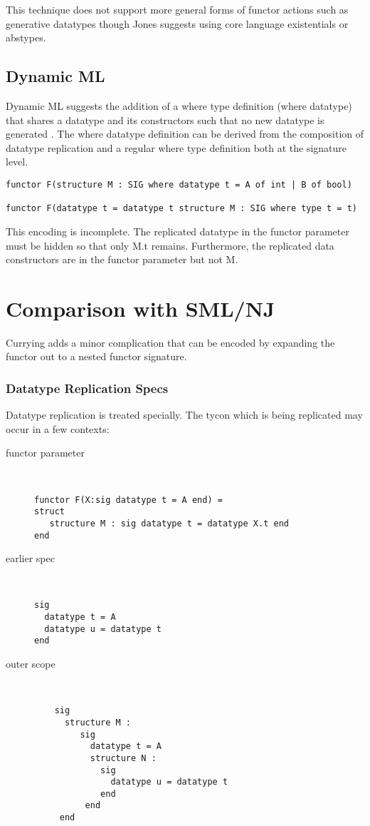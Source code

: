 This technique does not support more general forms of functor actions such as generative datatypes though Jones suggests using core language existentials or abstypes. 

\subsection{Dynamic ML}
Dynamic ML suggests the addition of a where type definition (where datatype) that shares a datatype and its constructors such that no new datatype is generated \cite{gilmore97dynamic}. The where datatype definition can be derived from the composition of datatype replication and a regular where type definition both at the signature level. 

\begin{lstlisting}
functor F(structure M : SIG where datatype t = A of int | B of bool)

functor F(datatype t = datatype t structure M : SIG where type t = t)
\end{lstlisting}

This encoding is incomplete. The replicated datatype in the functor parameter must be hidden so that only M.t remains. Furthermore, the replicated data constructors are in the functor parameter but not M. 

\section{Comparison with SML/NJ}
Currying adds a minor complication that can be encoded by expanding the functor out to a nested functor signature. %

\subsubsection{Datatype Replication Specs}
Datatype replication is treated specially. The tycon which is being replicated may occur in a few contexts:

\begin{description}
\item[functor parameter]~\\
\begin{lstlisting}
functor F(X:sig datatype t = A end) =
struct
   structure M : sig datatype t = datatype X.t end
end
\end{lstlisting}
\item[earlier spec]~\\
\begin{lstlisting}
sig
  datatype t = A
  datatype u = datatype t
end
\end{lstlisting}
\item[outer scope]~\\
  \begin{lstlisting}
    sig
      structure M :
         sig
           datatype t = A
           structure N :
             sig
               datatype u = datatype t
             end
          end
     end
  \end{lstlisting}
\end{description}

